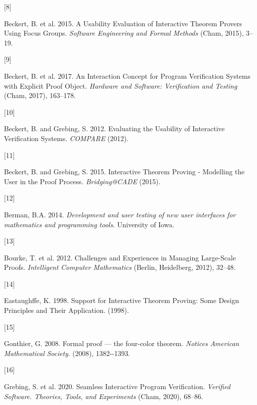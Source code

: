 \documentclass[
]{article}
\newlength{\cslhangindent}
\newlength{\csllabelwidth}
\newlength{\cslentryspacingunit} %
\newenvironment{CSLReferences}[2] %
 {%
  \setlength{\parindent}{0pt}
  \ifodd #1
  \let\oldpar\par
  \def\par{\hangindent=\cslhangindent\oldpar}
  \fi
  \setlength{\parskip}{#2\cslentryspacingunit}
 }%
 {}
\newcommand{\CSLLeftMargin}[1]{\parbox[t]{\csllabelwidth}{#1}}
\newcommand{\CSLRightInline}[1]{\parbox[t]{\linewidth - \csllabelwidth}{#1}\break}
\begin{document}
\begin{CSLReferences}{0}{0}
\leavevmode{}%
\CSLLeftMargin{{[}8{]} }
\CSLRightInline{Beckert, B. et al. 2015. A {Usability} {Evaluation} of
{Interactive} {Theorem} {Provers} {Using} {Focus} {Groups}.
\emph{Software {Engineering} and {Formal} {Methods}} (Cham, 2015),
3--19.}

\leavevmode{}%
\CSLLeftMargin{{[}9{]} }
\CSLRightInline{Beckert, B. et al. 2017. An {Interaction} {Concept} for
{Program} {Verification} {Systems} with {Explicit} {Proof} {Object}.
\emph{Hardware and {Software}: {Verification} and {Testing}} (Cham,
2017), 163--178.}

\leavevmode{}%
\CSLLeftMargin{{[}10{]} }
\CSLRightInline{Beckert, B. and Grebing, S. 2012. Evaluating the
{Usability} of {Interactive} {Verification} {Systems}. \emph{{COMPARE}}
(2012).}

\leavevmode{}%
\CSLLeftMargin{{[}11{]} }
\CSLRightInline{Beckert, B. and Grebing, S. 2015. Interactive {Theorem}
{Proving} - {Modelling} the {User} in the {Proof} {Process}.
\emph{Bridging@{CADE}} (2015).}

\leavevmode{}%
\CSLLeftMargin{{[}12{]} }
\CSLRightInline{Berman, B.A. 2014. \emph{Development and user testing of
new user interfaces for mathematics and programming tools}. University
of Iowa.}

\leavevmode{}%
\CSLLeftMargin{{[}13{]} }
\CSLRightInline{Bourke, T. et al. 2012. Challenges and {Experiences} in
{Managing} {Large}-{Scale} {Proofs}. \emph{Intelligent {Computer}
{Mathematics}} (Berlin, Heidelberg, 2012), 32--48.}

\leavevmode{}%
\CSLLeftMargin{{[}14{]} }
\CSLRightInline{Eastaughffe, K. 1998. Support for {Interactive}
{Theorem} {Proving}: {Some} {Design} {Principles} and {Their}
{Application}. (1998).}

\leavevmode{}%
\CSLLeftMargin{{[}15{]} }
\CSLRightInline{Gonthier, G. 2008. Formal proof --- the four-color
theorem. \emph{Notices American Mathematical Society}. (2008),
1382-\/-1393.}

\leavevmode{}%
\CSLLeftMargin{{[}16{]} }
\CSLRightInline{Grebing, S. et al. 2020. Seamless {Interactive}
{Program} {Verification}. \emph{Verified {Software}. {Theories},
{Tools}, and {Experiments}} (Cham, 2020), 68--86.}


\end{CSLReferences}
\end{document}

